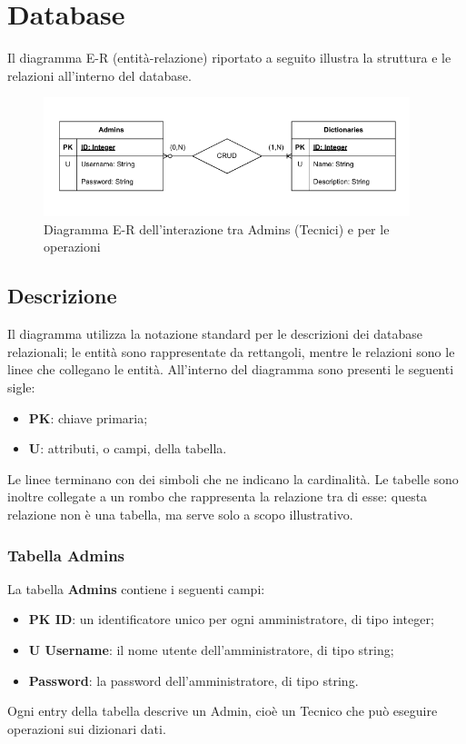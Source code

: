 \section{Database}

\par Il diagramma E-R (entità-relazione) riportato a seguito illustra la struttura e le relazioni all'interno del database.

\begin{figure}[H]
    \centering
    \includegraphics[width=0.95\textwidth]{assets/Database/DiagrammiDB.png}
    \caption{Diagramma E-R dell'interazione tra Admins (Tecnici) e  per le operazioni }
\end{figure}

\subsection{Descrizione}
\par Il diagramma utilizza la notazione standard per le descrizioni dei database relazionali; le entità sono rappresentate da rettangoli, mentre le relazioni sono le linee che collegano le entità. All'interno del diagramma sono presenti le seguenti sigle:
\begin{itemize}
    \item \textbf{PK}: chiave primaria;
    \item \textbf{U}: attributi, o campi, della tabella.
\end{itemize}

\par Le linee terminano con dei simboli che ne indicano la cardinalità. Le tabelle sono inoltre collegate a un rombo che rappresenta la relazione tra di esse: questa relazione non è una tabella, ma serve solo a scopo illustrativo.

\subsubsection{Tabella Admins}
\par La tabella \textbf{Admins} contiene i seguenti campi:
\begin{itemize}
    \item \textbf{PK ID}: un identificatore unico per ogni amministratore, di tipo integer;
    \item \textbf{U Username}: il nome utente dell'amministratore, di tipo string;
    \item \textbf{Password}: la password dell'amministratore, di tipo string.
\end{itemize}
\par Ogni entry della tabella descrive un Admin, cioè un Tecnico che può eseguire operazioni  sui dizionari dati.

